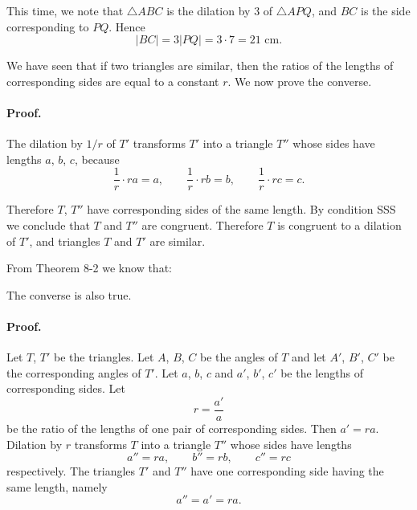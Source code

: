 \documentclass[12pt]{book} %
\begin{document}
This time, we note that $\triangle ABC$ is the dilation by 3 of $\triangle APQ$, and $BC$ is the side corresponding to $PQ$. Hence
\[
|BC|=3|PQ|=3\cdot 7=21\text{ cm.}
\]

We have seen that if two triangles are similar, then the ratios of the lengths of corresponding sides are equal to a constant $r$. We now prove the converse.


\paragraph{Proof.}
The dilation by $1/r$ of $T'$ transforms $T'$ into a triangle $T''$ whose sides have lengths $a$, $b$, $c$, because
\[
\frac1r\cdot ra=a,\qquad \frac1r\cdot rb=b,\qquad \frac1r\cdot rc=c.
\]

Therefore $T$, $T''$ have corresponding sides of the same length. By condition SSS we conclude that $T$ and $T''$ are congruent. Therefore $T$ is congruent to a dilation of $T'$, and triangles $T$ and $T'$ are similar.

From Theorem 8-2 we know that:


The converse is also true.


\paragraph{Proof.}
Let $T$, $T'$ be the triangles. Let $A$, $B$, $C$ be the angles of $T$ and let $A'$, $B'$, $C'$ be the corresponding angles of $T'$. Let $a$, $b$, $c$ and $a'$, $b'$, $c'$ be the lengths of corresponding sides. Let
\[
r=\frac{a'}{a}
\]
be the ratio of the lengths of one pair of corresponding sides. Then $a'=ra$. Dilation by $r$ transforms $T$ into a triangle $T''$ whose sides have lengths
\[
a''=ra,\qquad b''=rb,\qquad c''=rc
\]
respectively. The triangles $T'$ and $T''$ have one corresponding side having the same length, namely
\[
a''=a'=ra.
\]
\end{document}
